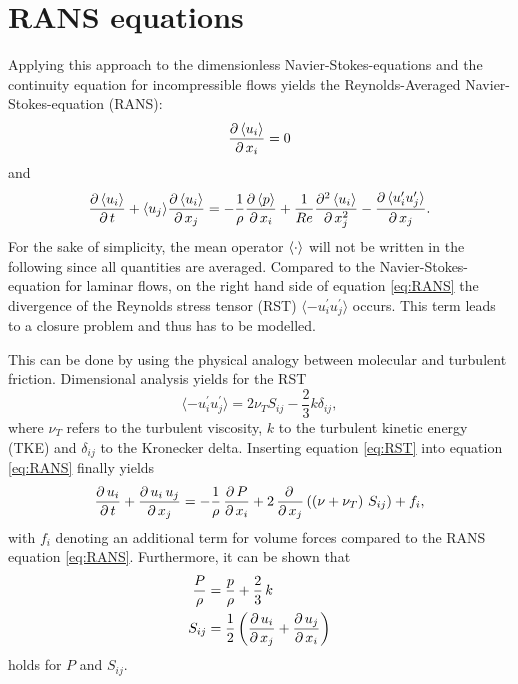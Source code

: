 \section{RANS equations} %
\label{sec:rans_equations}
Applying this approach to the dimensionless Navier-Stokes-equations and the continuity equation for incompressible flows yields the Reynolds-Averaged Navier-Stokes-equation (RANS):
\begin{equation}\label{eq:conti}
	\frac{\partial\,\langle u_i \rangle}{\partial\,x_i} = 0
\end{equation}
and
\begin{equation}
	\label{eq:RANS}
	\frac{\partial\,\langle u_i \rangle}{\partial\,t} + \langle u_j \rangle \frac{\partial\,\langle u_i \rangle}{\partial\,x_j} = -\frac{1}{\rho} \frac{\partial\,\langle p \rangle}{\partial\,x_i}+\frac{1}{Re} \frac{\partial^2\,\langle u_i \rangle}{\partial\,x_j^2}-\frac{\partial\,\langle u_i^{\prime}u_j^{\prime} \rangle}{\partial\,x_j}.
\end{equation}
For the sake of simplicity, the mean operator $\left\langle \cdot \right\rangle$ will not be written in the following since all quantities are averaged. Compared to the Navier-Stokes-equation for laminar flows, on the right hand side of equation \eqref{eq:RANS} the divergence of the Reynolds stress tensor (RST) $\langle -u_i^{\prime}u_j^{\prime} \rangle$ occurs. This term leads to a closure problem and thus has to be modelled.

\noii This can be done by using the physical analogy between molecular and turbulent friction. Dimensional analysis yields for the RST
\begin{equation}
	\label{eq:RST}
	\langle -u_i^{\prime}u_j^{\prime} \rangle = 2\nu_T S_{ij} - \frac{2}{3} k \delta_{ij},
\end{equation}
where $\nu_T$ refers to the turbulent viscosity, $k$ to the turbulent kinetic energy (TKE) and $\delta_{ij}$ to the Kronecker delta.
Inserting equation \eqref{eq:RST} into equation \eqref{eq:RANS} finally yields
\begin{equation}
	\label{eq:RANSmodified}
	\frac{\partial\,u_i}{\partial\,t}+\frac{\partial\,u_i\,u_j}{\partial\,x_j}=-\frac{1}{\rho}\,\frac{\partial\,P}{\partial\,x_i}+2\,\frac{\partial\,}{\partial\,x_j}\left( \left(\nu+\nu_T\right)\,S_{ij} \right)+f_i,
\end{equation}
with $f_i$ denoting an additional term for volume forces compared to the RANS equation \eqref{eq:RANS}. Furthermore, it can be shown that
\begin{equation}
	\begin{split}
		\frac{P}{\rho} &= \frac{p}{\rho}+\frac{2}{3}\,k \\
		S_{ij}         &= \frac{1}{2}\left(\frac{\partial\,u_i}{\partial\,x_j}+\frac{\partial\,u_j}{\partial\,x_i}\right)
	\end{split}
\end{equation}
holds for $P$ and $S_{ij}$. 

